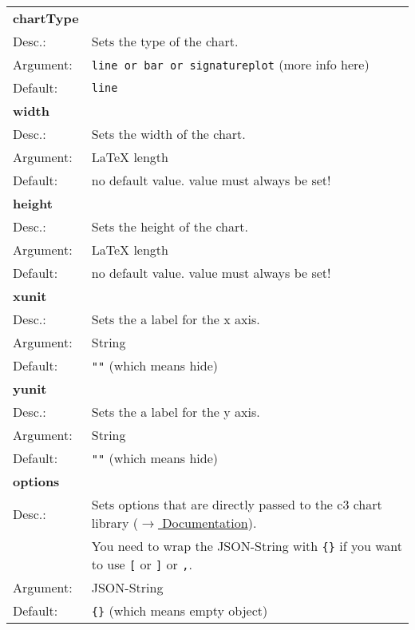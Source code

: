 \documentclass[11pt]{scrartcl}
\begin{document}
\begin{tabular}{ll}
\textbf{chartType} & \\
Desc.:	&	Sets the type of the chart. \\
Argument:	&\verb|line or bar or signatureplot| (more info here)  \\
Default:&	\verb|line| \\[4pt]

\textbf{width} & \\
Desc.:	&	Sets the width of the chart. \\
Argument:	&LaTeX length \\
Default:&	no default value. value must always be set! \\[4pt]

\textbf{height} \\
Desc.:	&	Sets the height of the chart. \\
Argument: &	LaTeX length \\
Default:&	no default value. value must always be set! \\[4pt]

\textbf{xunit} \\
Desc.:	&	Sets the a label for the x axis. \\
Argument: &	String \\
Default:& 	\verb|""| (which means hide) \\[4pt]

\textbf{yunit} \\
Desc.:	&	Sets the a label for the y axis. \\
Argument: 	&String \\
Default:& 	\verb|""| (which means hide) \\[4pt]

\textbf{options} \\
Desc.:	&	Sets options that are directly passed to the c3 chart library (\href{http://c3js.org/reference.html}{$\rightarrow$ Documentation}). \\
& You need to wrap the JSON-String with \verb|{}| if you want to use \verb|[| or \verb|]| or \verb|,|. \\
Argument: 	&JSON-String \\
Default:&	\verb|{}| (which means empty object) \\[4pt]



\end{tabular}
\end{document}
